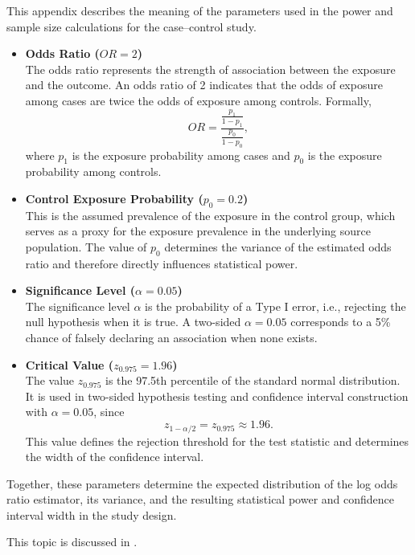 \documentclass[11pt]{article}
\begin{document}
This appendix describes the meaning of the parameters used in the power and sample size calculations for the case--control study.

\begin{itemize}

\item \textbf{Odds Ratio ($OR = 2$)} \\ The odds ratio represents the
  strength of association between the exposure and the outcome. An
  odds ratio of 2 indicates that the odds of exposure among cases are
  twice the odds of exposure among controls. Formally,
\[
OR = \frac{ \frac{p_1}{1 - p_1} }{ \frac{p_0}{1 - p_0} },
\]
where $p_1$ is the exposure probability among cases and $p_0$ is the
exposure probability among controls.

\vspace{0.5em}

\item \textbf{Control Exposure Probability ($p_0 = 0.2$)} \\
This is the assumed prevalence of the exposure in the control group,
which serves as a proxy for the exposure prevalence in the underlying
source population. The value of $p_0$ determines the variance of the
estimated odds ratio and therefore directly influences statistical
power.

\vspace{0.5em}

\item \textbf{Significance Level ($\alpha = 0.05$)} \\
The significance level $\alpha$ is the probability of a Type I error,
i.e., rejecting the null hypothesis when it is true. A two-sided
$\alpha = 0.05$ corresponds to a 5\% chance of falsely declaring an
association when none exists.

\vspace{0.5em}

\item \textbf{Critical Value ($z_{0.975} = 1.96$)} \\
The value $z_{0.975}$ is the 97.5th percentile of the standard normal
distribution. It is used in two-sided hypothesis testing and
confidence interval construction with $\alpha = 0.05$, since
\[
z_{1 - \alpha/2} = z_{0.975} \approx 1.96.
\]
This value defines the rejection threshold for the test statistic and
determines the width of the confidence interval.

\end{itemize}

\noindent Together, these parameters determine the expected
distribution of the log odds ratio estimator, its variance, and the
resulting statistical power and confidence interval width in the study
design.

This topic is discussed in \cite{ferdous2022microbiome_power}.



\end{document}
